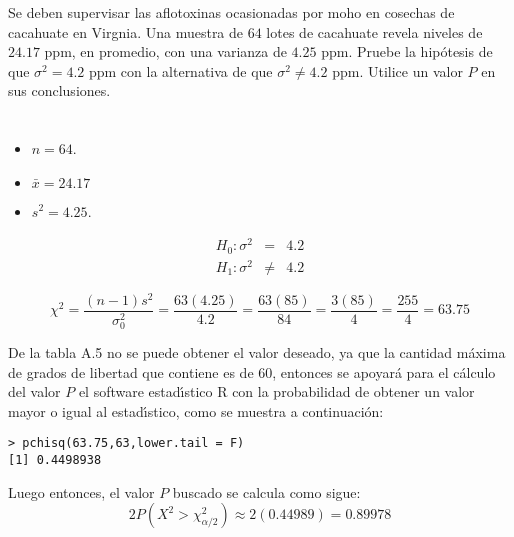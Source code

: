 \begin{enunciado}
 Se deben supervisar las aflotoxinas ocasionadas por moho en cosechas de cacahuate
 en Virgnia.
 Una muestra de $64$ lotes de cacahuate revela niveles de $24.17$ ppm,
 en promedio, con una varianza de $4.25$ ppm.
 Pruebe la hip\'otesis de que $\sigma^2 = 4.2$ ppm
 con la alternativa de que $\sigma^2 \neq 4.2$ ppm.
 Utilice un valor $P$ en sus conclusiones.
\end{enunciado}

\begin{solucion}
 \begin{datos}
  $\phantom{0}$
  \begin{itemize}
   \item $n = 64$.
   \item $\bar{x} = 24.17$
   \item $s^2 = 4.25$.
  \end{itemize}
 \end{datos}

 \begin{hipotesis}
  \begin{eqnarray*}
   H_0: \sigma^2 &  =   & 4.2 \\
   H_1: \sigma^2 & \neq & 4.2
  \end{eqnarray*}
 \end{hipotesis}

 \begin{estadistico}
  \begin{equation*}
   \chi^2 = \frac{(n-1)s^2}{\sigma_0^2}
   = \frac{63(4.25)}{4.2} = \frac{63(85)}{84} = \frac{3(85)}{4}
   = \frac{255}{4} = 63.75
  \end{equation*}
 \end{estadistico}

 \begin{valorp}
  De la tabla A.5 no se puede obtener el valor deseado,
  ya que la cantidad m\'axima de grados de libertad que contiene es de $60$,
  entonces se apoyar\'a para el c\'alculo del valor $P$ el software
  estad\'{\i}stico R con la probabilidad de obtener un valor mayor o igual
  al estad\'{\i}stico, como se muestra a continuaci\'on:
  \begin{verbatim}
> pchisq(63.75,63,lower.tail = F)
[1] 0.4498938
  \end{verbatim}
  Luego entonces, el valor $P$ buscado se calcula como sigue:
  \begin{equation*}
   2P\left( X^2 > \chi_{\alpha/2}^2 \right) \approx 2(0.44989) = 0.89978
  \end{equation*}
 \end{valorp}


\end{solucion}
